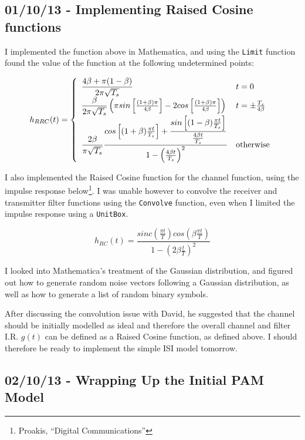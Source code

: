 \subsection{01/10/13 - Implementing Raised Cosine functions}

I implemented the function above in Mathematica, and using the
\texttt{Limit} function found the value of the function at the following
undetermined points:

\[
h_{RRC}(t) = \left\{
  \begin{array}{l l}
    \dfrac{4 \beta + \pi (1 - \beta)}{2 \pi \sqrt{T_s}} & t = 0 \\
    \dfrac{\beta}{2 \pi \sqrt{T_s}} \left ( \pi sin \left [ \frac{(1 + \beta) \pi}{4 \beta} \right ] - 2 cos \left [ \frac{(1 + \beta) \pi}{4 \beta} \right ] \right ) & t = \pm \frac{T_s}{ 4 \beta } \\
    \dfrac{2 \beta}{\pi \sqrt{T_s}} \dfrac{cos \left [ (1 + \beta) \frac{\pi t}{T_s} \right ] + \dfrac{sin \left [ (1 - \beta) \frac{\pi t}{T_s} \right ]}{\frac{4 \beta t}{T_s}}}{1 - \left ( \frac{4 \beta t}{T_s} \right )^2} & \text{otherwise}
  \end{array}\right.
\]

I also implemented the Raised Cosine function for the channel function,
using the impulse response below\footnote{Proakis, ``Digital
  Communications''}. I was unable however to convolve the receiver and
transmitter filter functions using the \texttt{Convolve} function, even
when I limited the impulse response using a \texttt{UnitBox}.

\[
h_{RC}(t) = \frac{sinc \left ( \frac{\pi t}{T} \right ) cos \left ( \beta \frac{\pi t}{T} \right )}{1 - \left ( 2 \beta \frac{t}{T} \right )^2}
\]

I looked into Mathematica's treatment of the Gaussian distribution, and
figured out how to generate random noise vectors following a Gaussian
distribution, as well as how to generate a list of random binary
symbols.

After discussing the convolution issue with David, he suggested that the
channel should be initially modelled as ideal and therefore the overall
channel and filter I.R. $g(t)$ can be defined as a Raised Cosine
function, as defined above. I should therefore be ready to implement the
simple ISI model tomorrow.

\subsection{02/10/13 - Wrapping Up the Initial PAM Model}

